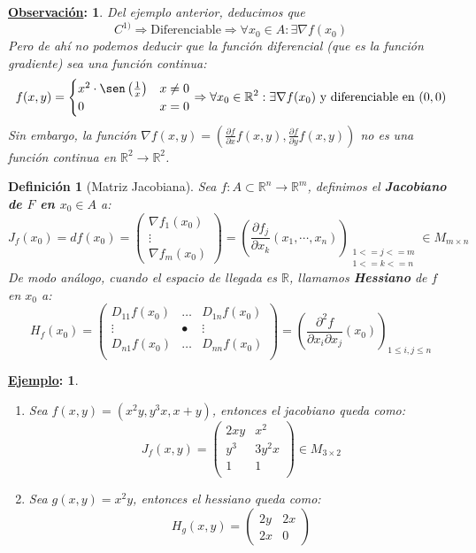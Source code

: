 \documentclass[10pt,a4paper,openright]{book}
\theoremstyle{break}
\newtheorem*{defi}{Definición}
\newtheorem*{obs}{\underline{Observación}:}
\newtheorem*{ej}{\underline{Ejemplo}:}
\begin{document}
\begin{obs}
Del ejemplo anterior, deducimos que
$$C^{1)}\Rightarrow \mbox{Diferenciable} \Rightarrow \forall x_0 \in A: \exists \nabla f(x_0)$$
Pero de ahí no podemos deducir que la función diferencial (que es la función gradiente) sea una función continua:
$$f(x,y) = \begin{cases} x^2 \cdot \sen\left(\frac{1}{x}\right)  & x \neq 0 \\ 0 & x = 0 \end{cases} \Rightarrow \forall x_0\in \mathbb R^2: \exists\nabla f(x_0) \mbox{ y diferenciable en }(0,0)$$
Sin embargo, la función $\nabla f(x,y) = (\frac{\partial f}{\partial x}f(x,y), \frac{\partial f}{\partial y} f(x,y))$ no es una función continua en $\mathbb{R}^2 \to \mathbb{R}^2$.
\end{obs}

\begin{defi}[Matriz Jacobiana]
Sea $f : A \subset \mathbb{R}^n \to \mathbb{R}^m$, definimos el \textbf{Jacobiano de $F$ en $x_0 \in A$} a:
$$J_f (x_0) = df(x_0) = \begin{pmatrix} \nabla f_1(x_0) \\ \vdots \\ \nabla f_m (x_0)\end{pmatrix} = \left(\frac{\partial f_j}{\partial x_k}(x_1, \cdots , x_n)\right)_{\substack{1 <= j <= m \\ 1<= k <= n}} \in M_{m \times n}$$
De modo análogo, cuando el espacio de llegada es $\mathbb{R}$, llamamos  \textbf{Hessiano} de $f$ en $x_0$ a:
$$H_f (x_0) = \begin{pmatrix} D_{11} f(x_0) & \ldots & D_{1n}f(x_0) \\ \vdots & • & \vdots \\ D_{n1}f(x_0) & \ldots & D_{nn}f(x_0) \\
\end{pmatrix} = \left( \frac{\partial^2 f}{\partial x_i \partial x_j } (x_0)\right)_{1 \leq i,j \leq n}$$
\end{defi}

\begin{ej}
\begin{enumerate}
\item Sea $f(x,y) = (x^2 y , y^3 x, x+y)$, entonces el jacobiano queda como:
$$J_f (x,y) = \begin{pmatrix} 2xy & x^2 \\ y^3 & 3y^2 x  \\ 1 & 1  \\\end{pmatrix} \in M_{3 \times 2}$$
\item Sea $g(x,y) = x^2y$, entonces el hessiano queda como:
$$H_g (x,y) = \begin{pmatrix} 2y & 2x  \\ 2x & 0 \end{pmatrix}$$
\end{enumerate}
\end{ej}
\end{document}
